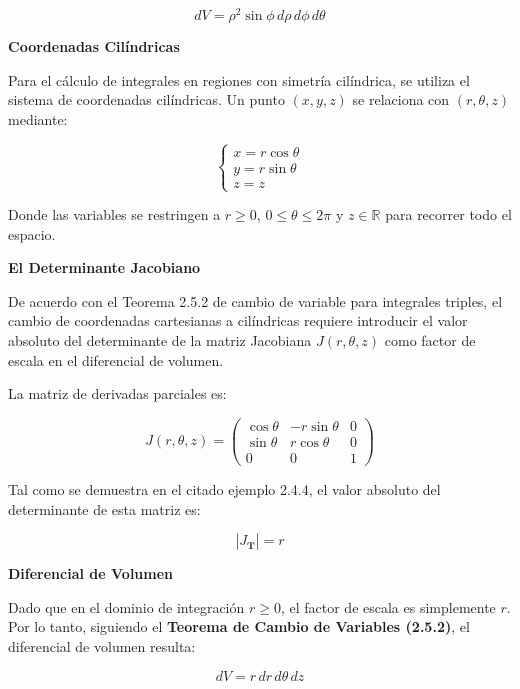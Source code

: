 \begin{equation}
    dV = \rho^2 \sin \phi \, d\rho \, d\phi \, d\theta
\end{equation}


\vspace{1cm}


\noindent\textbf{Coordenadas Cilíndricas}
\vspace{0.2cm}

Para el cálculo de integrales en regiones con simetría cilíndrica, se utiliza el sistema de coordenadas cilíndricas. Un punto $(x, y, z)$ se relaciona con $(r, \theta, z)$ mediante:

\begin{equation}
\begin{cases} 
x = r \cos \theta \\ 
y = r \sin \theta \\ 
z = z 
\end{cases}
\end{equation}

Donde las variables se restringen a $r \ge 0$, $0 \le \theta \le 2\pi$ y $z \in \mathbb{R}$ para recorrer todo el espacio.

\vspace{0.4cm}
\noindent\textbf{El Determinante Jacobiano}

De acuerdo con el Teorema 2.5.2 de cambio de variable para integrales triples, el cambio de coordenadas cartesianas a cilíndricas requiere introducir el valor absoluto del determinante de la matriz Jacobiana $J(r, \theta, z)$ como factor de escala en el diferencial de volumen.

La matriz de derivadas parciales es:

\begin{equation}
J(r, \theta, z) = 
\begin{pmatrix} 
\cos \theta & -r \sin \theta & 0 \\ 
\sin \theta & r \cos \theta & 0 \\ 
0 & 0 & 1 
\end{pmatrix}
\end{equation}

Tal como se demuestra en el citado ejemplo 2.4.4, el valor absoluto del determinante de esta matriz es:

\begin{equation}
|J_{\mathbf{T}}| = r
\end{equation}

\vspace{0.4cm}
\noindent\textbf{Diferencial de Volumen}

Dado que en el dominio de integración $r \ge 0$, el factor de escala es simplemente $r$. Por lo tanto, siguiendo el \textbf{Teorema de Cambio de Variables (2.5.2)}, el diferencial de volumen resulta:

\begin{equation}
dV = r \, dr \, d\theta \, dz
\end{equation}